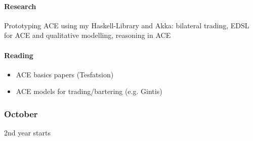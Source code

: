 \paragraph{Research} Prototyping ACE using my Haskell-Library and Akka: bilateral trading, EDSL for ACE and qualitative modelling, reasoning in ACE
	
\paragraph{Reading}
	\begin{itemize}	
		\item ACE basics papers (Tesfatsion)
		\item ACE models for trading/bartering (e.g. Gintis)
	\end{itemize}
	 
\subsubsection{October}
2nd year starts